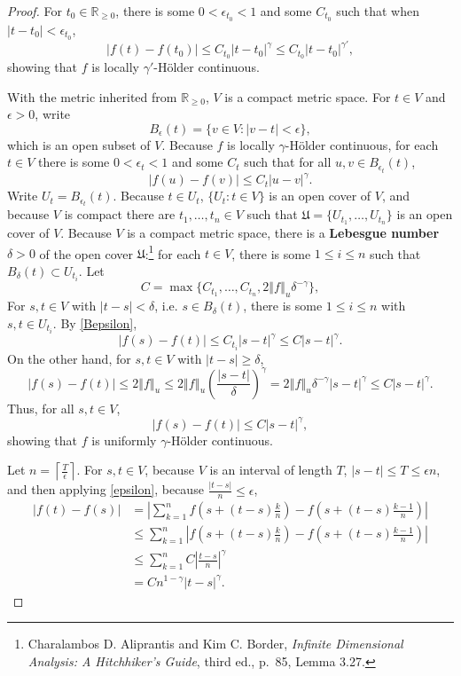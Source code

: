 \documentclass{article}
\newcommand{\norm}[1]{\left\Vert #1 \right\Vert}
\theoremstyle{definition}
\begin{document}
\begin{proof}
For $t_0 \in \mathbb{R}_{\geq 0}$, there is some $0<\epsilon_{t_0}<1$ and some $C_{t_0}$ such that when
$|t-t_0|< \epsilon_{t_0}$,
\[
|f(t)-f(t_0)| \leq C_{t_0} |t-t_0|^\gamma \leq C_{t_0} |t-t_0|^{\gamma'},
\]
showing that $f$ is locally $\gamma'$-H\"older continuous.


With the metric inherited from $\mathbb{R}_{\geq 0}$, $V$ is a compact  metric space. 
For $t \in V$ and $\epsilon>0$, write
\[
B_\epsilon(t) = \{v \in V: |v-t| < \epsilon\},
\]
which is an open subset of $V$.
Because $f$ is locally $\gamma$-H\"older continuous, for each $t \in V$ there is some $0<\epsilon_t<1$ and some
$C_t$ such that for all $u,v \in B_{\epsilon_t}(t)$,
\begin{equation}
|f(u)-f(v)| \leq C_t |u-v|^\gamma.
\label{Bepsilon}
\end{equation}
Write $U_t=B_{\epsilon_t}(t)$. Because $t \in U_t$, 
$\{U_t: t \in V\}$ is an open cover of $V$, and because $V$ is compact there are $t_1,\ldots,t_n \in V$ such that
$\mathfrak{U}=\{U_{t_1},\ldots,U_{t_n}\}$ is an open cover of $V$.
Because $V$ is a compact metric space, there is a \textbf{Lebesgue number} $\delta>0$ of the open cover $\mathfrak{U}$:\footnote{Charalambos D. Aliprantis
and Kim C. Border, {\em Infinite Dimensional Analysis: A Hitchhiker's Guide}, third ed., p.~85, Lemma 3.27.}
for each $t \in V$, there is some $1 \leq i \leq n$ such that $B_\delta(t) \subset U_{t_i}$. 
Let 
\[
C = \max\{C_{t_1},\ldots,C_{t_n},2\norm{f}_u \delta^{-\gamma}\},
\]
 For $s,t \in V$ with $|t-s| < \delta$, i.e.
  $s \in B_\delta(t)$, there is some $1 \leq i \leq n$ with
 $s,t \in U_{t_i}$. By \eqref{Bepsilon},
 \[
 |f(s)-f(t)| \leq C_{t_i} |s-t|^\gamma \leq C|s-t|^\gamma.
 \]
 On the other hand, for $s,t \in V$ with $|t-s| \geq \delta$, 
 \[
 |f(s)-f(t)| \leq 2 \norm{f}_u  \leq 2 \norm{f}_u \left(\frac{|s-t|}{\delta} \right)^\gamma 
 =2\norm{f}_u \delta^{-\gamma} |s-t|^\gamma
 \leq C|s-t|^\gamma.
 \]
 Thus, for all $s,t \in V$, 
 \[
 |f(s)-f(t)| \leq C |s-t|^\gamma,
 \]
 showing that $f$ is uniformly $\gamma$-H\"older continuous.
 
 Let $n = \left\lceil \frac{T}{\epsilon} \right\rceil$. For $s,t \in V$, because $V$ is an interval of length $T$, 
 $|s-t| \leq T \leq \epsilon n$, and then applying \eqref{epsilon}, because $\frac{|t-s|}{n} \leq \epsilon$,
\begin{align*}
|f(t)-f(s)|&= \left| \sum_{k=1}^n f\left(s+(t-s)\frac{k}{n}\right)-f\left(s+(t-s)\frac{k-1}{n}\right)\right|\\
&\leq \sum_{k=1}^n \left| f\left(s+(t-s)\frac{k}{n}\right)-f\left(s+(t-s)\frac{k-1}{n}\right)\right|\\
&\leq \sum_{k=1}^n C\left|\frac{t-s}{n}\right|^\gamma\\
&=C n^{1-\gamma} |t-s|^\gamma.
\end{align*}
\end{proof}
\end{document}

